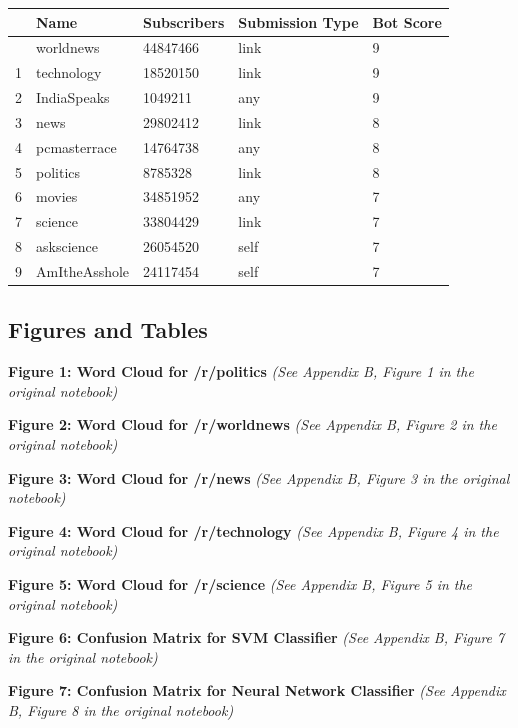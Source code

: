 \documentclass[
  12pt,
  letterpaper,
  DIV=11,
  numbers=noendperiod]{scrartcl}
\begin{document}
\begin{longtable}[]{@{}lllll@{}}
\toprule\noalign{}
& Name & Subscribers & Submission Type & Bot Score \\
\midrule\noalign{}
\endhead
\bottomrule\noalign{}
\endlastfoot
0 & worldnews & 44847466 & link & 9 \\
1 & technology & 18520150 & link & 9 \\
2 & IndiaSpeaks & 1049211 & any & 9 \\
3 & news & 29802412 & link & 8 \\
4 & pcmasterrace & 14764738 & any & 8 \\
5 & politics & 8785328 & link & 8 \\
6 & movies & 34851952 & any & 7 \\
7 & science & 33804429 & link & 7 \\
8 & askscience & 26054520 & self & 7 \\
9 & AmItheAsshole & 24117454 & self & 7 \\
\end{longtable}

\subsection*{Figures and Tables}\label{figures-and-tables}

\textbf{Figure 1: Word Cloud for /r/politics} \emph{(See Appendix B,
Figure 1 in the original notebook)}

\textbf{Figure 2: Word Cloud for /r/worldnews} \emph{(See Appendix B,
Figure 2 in the original notebook)}

\textbf{Figure 3: Word Cloud for /r/news} \emph{(See Appendix B, Figure
3 in the original notebook)}

\textbf{Figure 4: Word Cloud for /r/technology} \emph{(See Appendix B,
Figure 4 in the original notebook)}

\textbf{Figure 5: Word Cloud for /r/science} \emph{(See Appendix B,
Figure 5 in the original notebook)}

\textbf{Figure 6: Confusion Matrix for SVM Classifier} \emph{(See
Appendix B, Figure 7 in the original notebook)}

\textbf{Figure 7: Confusion Matrix for Neural Network Classifier}
\emph{(See Appendix B, Figure 8 in the original notebook)}
\end{document}
